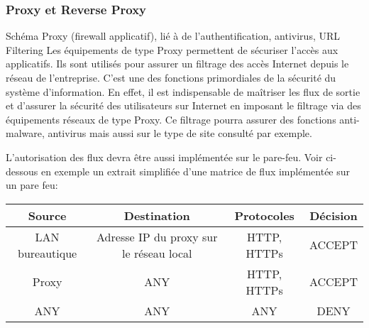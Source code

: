 
\subsubsection{Proxy et Reverse Proxy}
Schéma Proxy (firewall applicatif), lié à de l’authentification, antivirus, URL Filtering
Les équipements de type Proxy permettent de sécuriser l'accès aux applicatifs.
Ils sont utilisés pour assurer un filtrage des accès Internet depuis le réseau de l'entreprise.
C'est une des fonctions primordiales de la sécurité du système d'information.
En effet, il est indispensable de maîtriser les flux de sortie et d'assurer la sécurité des utilisateurs sur Internet en imposant le filtrage via des équipements réseaux de type Proxy. Ce filtrage pourra assurer des fonctions anti-malware, antivirus mais aussi sur le type de site consulté par exemple.

L'autorisation des flux devra être aussi implémentée sur le pare-feu.
Voir ci-dessous en exemple un extrait simplifiée d'une matrice de flux implémentée sur un pare feu:

\begin{center}
\begin{tabular}{||c c c c||} 
 \hline
 Source & Destination & Protocoles & Décision \\ [0.5ex] 
 \hline\hline
 LAN bureautique & Adresse IP du proxy sur le réseau local & HTTP, HTTPs & ACCEPT \\ 
 \hline
 Proxy & ANY & HTTP, HTTPs & ACCEPT \\
 \hline
 ANY & ANY & ANY & DENY \\
 \hline
\end{tabular}
\end{center}

